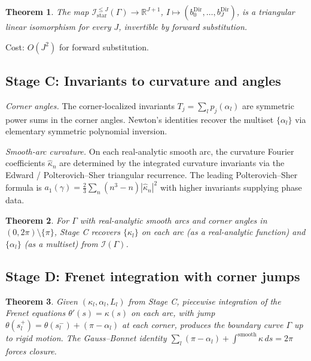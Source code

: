 \documentclass[11pt,reqno]{amsart}
\theoremstyle{plain}
\newtheorem{theorem}{Theorem}[section]
\theoremstyle{definition}
\theoremstyle{remark}
\newcommand{\Reals}{\mathbb{R}}
\newcommand{\Icalbb}{\mathcal{I}}
\begin{document}
\begin{theorem}\label{thm:stage-B-master}
The map $\Icalbb_{\mathrm{star}}^{\leq J}(\Gamma) \to \Reals^{J+1}$, $I \mapsto (b_0^{\mathrm{Dir}}, \dots, b_J^{\mathrm{Dir}})$, is a triangular linear isomorphism for every $J$, invertible by forward substitution.
\end{theorem}

Cost: $O(J^2)$ for forward substitution.

\subsection{Stage C: Invariants to curvature and angles}\label{sec:stage-C}

\emph{Corner angles.} The corner-localized invariants $T_j = \sum_l p_j(\alpha_l)$ are symmetric power sums in the corner angles. Newton's identities recover the multiset $\{\alpha_l\}$ via elementary symmetric polynomial inversion.

\emph{Smooth-arc curvature.} On each real-analytic smooth arc, the curvature Fourier coefficients $\widehat\kappa_n$ are determined by the integrated curvature invariants via the Edward / Polterovich--Sher triangular recurrence. The leading Polterovich--Sher formula is $a_1(\gamma) = \tfrac{2}{3}\sum_n(n^3 - n)|\widehat\kappa_n|^2$ with higher invariants supplying phase data.

\begin{theorem}\label{thm:stage-C-master}
For $\Gamma$ with real-analytic smooth arcs and corner angles in $(0, 2\pi)\setminus\{\pi\}$, Stage C recovers $\{\kappa_l\}$ on each arc (as a real-analytic function) and $\{\alpha_l\}$ (as a multiset) from $\Icalbb(\Gamma)$.
\end{theorem}

\subsection{Stage D: Frenet integration with corner jumps}\label{sec:stage-D}

\begin{theorem}\label{thm:stage-D-master}
Given $(\kappa_l, \alpha_l, L_l)$ from Stage C, piecewise integration of the Frenet equations $\theta'(s) = \kappa(s)$ on each arc, with jump $\theta(s_l^+) = \theta(s_l^-) + (\pi - \alpha_l)$ at each corner, produces the boundary curve $\Gamma$ up to rigid motion. The Gauss--Bonnet identity $\sum_l(\pi - \alpha_l) + \int^{\mathrm{smooth}}\kappa\,ds = 2\pi$ forces closure.
\end{theorem}
\end{document}
